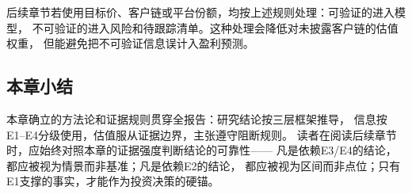 后续章节若使用目标价、客户链或平台份额，均按上述规则处理：可验证的进入模型，
不可验证的进入风险和待跟踪清单。这种处理会降低对未披露客户链的估值权重，
但能避免把不可验证信息误计入盈利预测。

\subsection{本章小结}

本章确立的方法论和证据规则贯穿全报告：研究结论按三层框架推导，
信息按E1--E4分级使用，估值服从证据边界，主张遵守阻断规则。
读者在阅读后续章节时，应始终对照本章的证据强度判断结论的可靠性——
凡是依赖E3/E4的结论，都应被视为情景而非基准；凡是依赖E2的结论，
都应被视为区间而非点位；只有E1支撑的事实，才能作为投资决策的硬锚。
